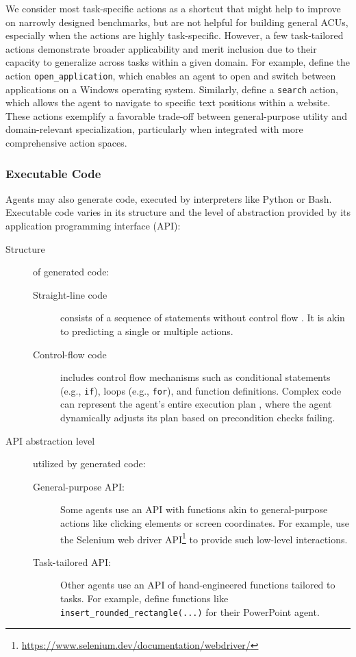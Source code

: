 We consider most task-specific actions as a shortcut that might help to improve on narrowly designed benchmarks, but are not helpful for building general ACUs, especially when the actions are highly task-specific.
However, a few task-tailored actions demonstrate broader applicability and merit inclusion due to their capacity to generalize across tasks within a given domain.
For example, \citet{bonatti_windows_2024} define the action \texttt{open\_application}, which enables an agent to open and switch between applications on a Windows operating system. Similarly, \citet{nakano_webgpt_2022} define a \texttt{search} action, which allows the agent to navigate to specific text positions within a website. These actions exemplify a favorable trade-off between general-purpose utility and domain-relevant specialization, particularly when integrated with more comprehensive action spaces.

\subsubsection{Executable Code}\label{sec:action_space_code}
Agents may also generate code, executed by interpreters like Python or Bash.
Executable code varies in its structure and the level of abstraction provided by its application programming interface (API):

\begin{description}
    \item[Structure] of generated code: \hfill
        \begin{description}
            \item[Straight-line code] consists of a sequence of statements without control flow . It is akin to predicting a single or multiple actions.
            \item[Control-flow code] includes control flow mechanisms such as conditional statements (e.g., \texttt{if}), loops (e.g., \texttt{for}), and function definitions. Complex code can represent the agent's entire execution plan \citep{sun_adaplanner_2023}, where the agent dynamically adjusts its plan based on precondition checks failing.
        \end{description}
    \item[API abstraction level] utilized by generated code: \hfill
        \begin{description}
            \item[General-purpose API:]
                Some agents use an API with functions akin to general-purpose actions like clicking elements or screen coordinates. For example, \citet{gur_real-world_2024} use the Selenium web driver API\footnote{\url{https://www.selenium.dev/documentation/webdriver/}} to provide such low-level interactions.
            \item[Task-tailored API:]
                Other agents use an API of hand-engineered functions tailored to tasks. For example, \citet{guo_pptc_2024} define functions like \texttt{insert\_rounded\_rectangle(...)} for their PowerPoint agent.
        \end{description}
\end{description}

